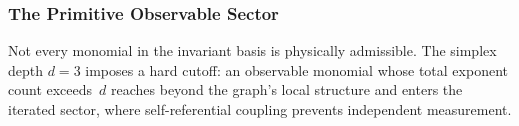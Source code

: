 \documentclass[11pt,a4paper]{book}
\begin{document}
\begin{code}
\AgdaSymbol{=}\AgdaSpace{}%
\<%
\\
\>[0][@{}l@{\AgdaIndent{0}}]%
\>[2]\AgdaSymbol{\{}\AgdaSpace{}%
%
\>[26]\AgdaSymbol{=}\AgdaSpace{}%
\<%
\\
%
\>[2]\AgdaSymbol{;}\AgdaSpace{}%
%
\>[26]\AgdaSymbol{=}\AgdaSpace{}%
\<%
\\
%
\>[2]\AgdaSymbol{;}\AgdaSpace{}%
%
\>[26]\AgdaSymbol{=}\AgdaSpace{}%
\<%
\\
%
\>[2]\AgdaSymbol{;}\AgdaSpace{}%
%
\>[26]\AgdaSymbol{=}\AgdaSpace{}%
\<%
\\
%
\>[2]\AgdaSymbol{;}\AgdaSpace{}%
%
\>[26]\AgdaSymbol{=}\AgdaSpace{}%
\<%
\\
%
\>[2]\AgdaSymbol{;}\AgdaSpace{}%
\AgdaSpace{}%
\AgdaSymbol{=}\AgdaSpace{}%
\<%
\\
%
\>[2]\AgdaSymbol{;}\AgdaSpace{}%
%
\>[26]\AgdaSymbol{=}\AgdaSpace{}%
\AgdaSpace{}%
\AgdaSymbol{()}\<%
\\
%
\>[2]\AgdaSymbol{;}\AgdaSpace{}%
%
\>[26]\AgdaSymbol{=}\AgdaSpace{}%
\AgdaSpace{}%
\AgdaSymbol{()}\<%
\\
%
\>[2]\AgdaSymbol{;}\AgdaSpace{}%
%
\>[26]\AgdaSymbol{=}\AgdaSpace{}%
\<%
\\
%
\>[2]\AgdaSymbol{\}}\<%
\end{code}

\subsubsection*{The Primitive Observable Sector}

Not every monomial in the invariant basis is physically admissible.
The simplex depth $d = 3$ imposes a hard cutoff: an observable monomial
whose total exponent count exceeds~$d$ reaches beyond the graph's local
structure and enters the iterated sector, where self-referential coupling
prevents independent measurement.
\end{document}

